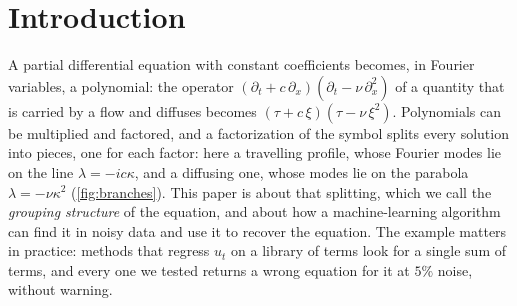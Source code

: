 \documentclass[11pt]{article}
\theoremstyle{plain}
\theoremstyle{definition}
\theoremstyle{remark}
\begin{document}
\section{Introduction}\label{sec:intro}
A partial differential equation with constant coefficients becomes, in Fourier variables, a polynomial: the operator
$(\partial_t+c\,\partial_x)(\partial_t-\nu\,\partial_x^2)$ of a quantity that is carried by a flow and diffuses becomes
$(\tau+c\,\xi)(\tau-\nu\,\xi^2)$. Polynomials can be multiplied and factored, and a factorization of the symbol splits
every solution into pieces, one for each factor: here a travelling profile, whose Fourier modes lie on the line
$\lambda=-ic\kappa$, and a diffusing one, whose modes lie on the parabola $\lambda=-\nu\kappa^2$ (\cref{fig:branches}).
This paper is about that splitting, which we call the \emph{grouping structure} of the equation, and about how a
machine-learning algorithm can find it in noisy data and use it to recover the equation. The example matters in
practice: methods that regress $u_t$ on a library of terms look for a single sum of terms, and every one we tested
returns a wrong equation for it at $5\%$ noise, without warning.
\end{document}
